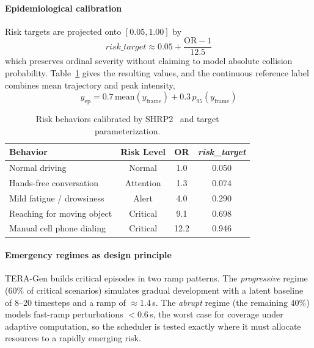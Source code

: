\documentclass[a4paper,fleqn]{cas-dc}
\newcommand{\TERAGen}{\mbox{TERA-Gen}\xspace}
\begin{document}
\paragraph{Epidemiological calibration}
Risk targets are projected onto $[0.05, 1.00]$ by
\begin{equation}
  \textit{risk\_target} \approx 0.05 + \frac{\mathrm{OR} - 1}{12.5}
  \label{eq:or_mapping}
\end{equation}
which preserves ordinal severity without claiming to model absolute collision
probability. Table~\ref{tab:shrp2_calibracao} gives the resulting values, and
the continuous reference label combines mean trajectory and peak intensity,
\begin{equation}
  y_{\text{ep}} = 0.7\,\mathrm{mean}(y_{\mathrm{frame}}) +
  0.3\,p_{95}(y_{\mathrm{frame}})
  \label{eq:agregacao}
\end{equation}
\begin{table}[!tbp]
\centering
\caption{Risk behaviors calibrated by SHRP2~\cite{dingus2016shrp2} and target parameterization.}
\label{tab:shrp2_calibracao}
\footnotesize
\setlength{\tabcolsep}{6pt}
\renewcommand{\arraystretch}{1.18}
\begin{tabular}{l c c c}
\toprule
\textbf{Behavior} & \textbf{Risk Level} & \textbf{OR}
  & \textbf{\textit{risk\_target}} \\
\midrule
Normal driving              & Normal   & 1.0  & 0.050 \\
\rowcolor{gray!8}
Hands-free conversation     & Attention & 1.3  & 0.074 \\
Mild fatigue / drowsiness   & Alert     & 4.0  & 0.290 \\
\rowcolor{gray!8}
Reaching for moving object  & Critical  & 9.1  & 0.698 \\
Manual cell phone dialing   & Critical  & 12.2 & 0.946 \\
\bottomrule
\end{tabular}
\end{table}
\paragraph{Emergency regimes as design principle}
\TERAGen builds critical episodes in two ramp patterns. The \textit{progressive}
regime (60\% of critical scenarios) simulates gradual development with a latent
baseline of 8--20 timesteps and a ramp of $\approx$1.4\,s. The \textit{abrupt}
regime (the remaining 40\%) models fast-ramp perturbations $<$0.6\,s, the worst
case for coverage under adaptive computation, so the scheduler is tested exactly
where it must allocate resources to a rapidly emerging risk.
\end{document}
